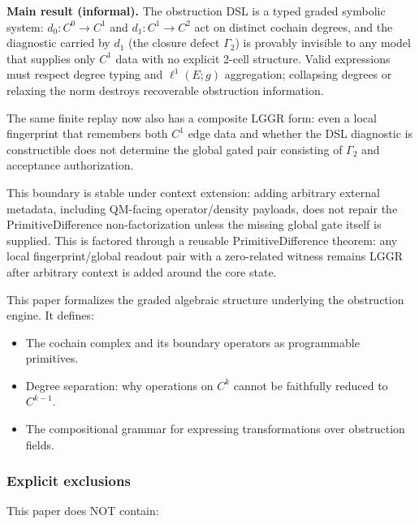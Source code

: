 \documentclass[
]{article}
\providecommand{\tightlist}{%
  \setlength{\itemsep}{0pt}\setlength{\parskip}{0pt}}
\providecommand{\tightlist}{%
  \setlength{\itemsep}{0pt}\setlength{\parskip}{0pt}}
\begin{document}
\textbf{Main result (informal).} The obstruction DSL is a typed graded symbolic system: \(d_0:C^0\to C^1\) and \(d_1:C^1\to C^2\) act on distinct cochain degrees, and the diagnostic carried by \(d_1\) (the closure defect \(\Gamma_2\)) is provably invisible to any model that supplies only \(C^1\) data with no explicit 2-cell structure. Valid expressions must respect degree typing and \(\ell^1(E;g)\) aggregation; collapsing degrees or relaxing the norm destroys recoverable obstruction information.

The same finite replay now also has a composite LGGR form: even a local fingerprint that remembers both \(C^1\) edge data and whether the DSL diagnostic is constructible does not determine the global gated pair consisting of \(\Gamma_2\) and acceptance authorization.

This boundary is stable under context extension: adding arbitrary external metadata, including QM-facing operator/density payloads, does not repair the PrimitiveDifference non-factorization unless the missing global gate itself is supplied. This is factored through a reusable PrimitiveDifference theorem: any local fingerprint/global readout pair with a zero-related witness remains LGGR after arbitrary context is added around the core state.

This paper formalizes the graded algebraic structure underlying the obstruction engine. It defines:

\begin{itemize}
\tightlist
\item
  The cochain complex and its boundary operators as programmable primitives.
\item
  Degree separation: why operations on \(C^k\) cannot be faithfully reduced to \(C^{k-1}\).
\item
  The compositional grammar for expressing transformations over obstruction fields.
\end{itemize}

\subsubsection{Explicit exclusions}\label{explicit-exclusions}

This paper does NOT contain:
\end{document}
